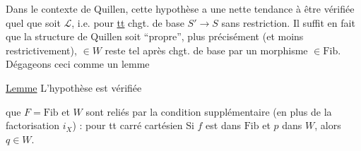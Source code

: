Dans le contexte de Quillen, cette hypothèse  a une nette tendance à être vérifiée quel  que soit $\mathcal L$, i.e. pour \uline{tt} chgt. de base $S'\longrightarrow S$ sans restriction. Il suffit en fait que la structure de Quillen soit ``propre'', plus précisément (et moins restrictivement),   $\in W$ reste tel après chgt. de base par un morphisme $\in\mathrm{Fib}$.
Dégageons ceci comme un lemme

\uline{Lemme} L'hypothèse est vérifiée  

que $F=\mathrm{Fib}$ et $W$ sont reliés par la condition supplémentaire (en plus de la factorisation $i_X$) : pour tt carré cartésien
Si $f$ est dans $\mathrm{Fib}$ et $p$ dans $W$, alors $q\in W$.

